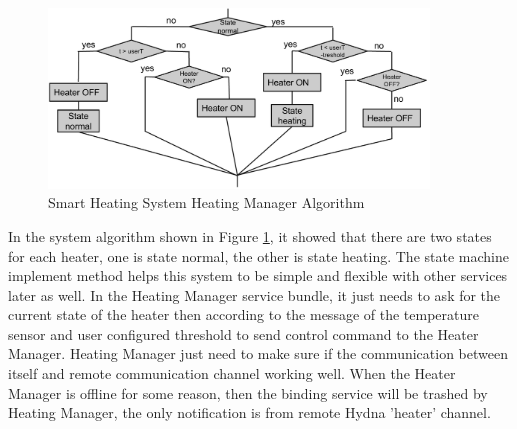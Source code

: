 \clearpage

\begin{figure}
	\centering    	
\includegraphics[width=0.90\textwidth,natwidth=610,natheight=642]{figs/system_algorithm.png}
  	\caption{Smart Heating System Heating Manager Algorithm}
  	\label{fig:system_algorithm}
\end{figure}

\par In the system algorithm shown in Figure \ref{fig:system_algorithm}, it showed that there are two states for each heater, one is state normal, the other is state heating. The state machine implement method helps this system to be simple and flexible with other services later as well. In the Heating Manager service bundle, it just needs to ask for the current state of the heater then according to the message of the temperature sensor and user configured threshold to send control command to the Heater Manager. Heating Manager just need to make sure if the communication between itself and remote communication channel working well. When the Heater Manager is offline for some reason, then the binding service will be trashed by Heating Manager, the only notification is from remote Hydna 'heater' channel.


